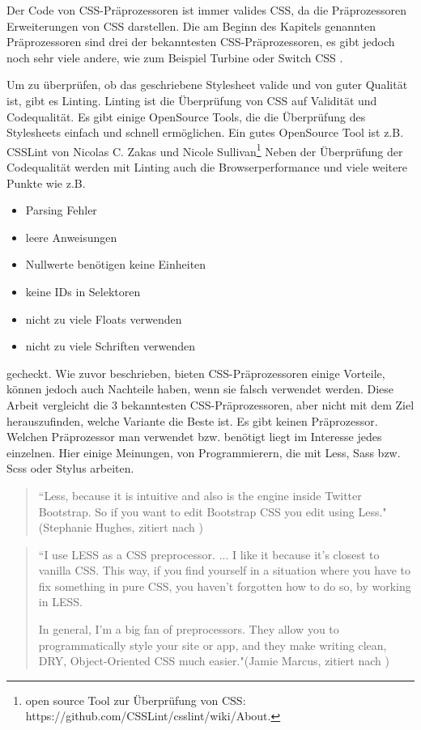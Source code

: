 Der Code von CSS-Präprozessoren ist immer valides CSS, da die Präprozessoren Erweiterungen von CSS darstellen. Die am Beginn des Kapitels genannten Präprozessoren sind drei der bekanntesten CSS-Präprozessoren, es gibt jedoch noch sehr viele andere, wie zum Beispiel Turbine oder Switch CSS \autocite[]{Jung.2010}.

Um zu überprüfen, ob das geschriebene Stylesheet valide und von guter Qualität ist, gibt es Linting. Linting ist die Überprüfung von CSS auf Validität und Codequalität. Es gibt einige OpenSource Tools, die die Überprüfung des Stylesheets einfach und schnell ermöglichen. Ein gutes OpenSource Tool ist z.B. CSSLint von Nicolas C. Zakas und Nicole Sullivan\footnote[1]{open source Tool zur Überprüfung von CSS: https://github.com/CSSLint/csslint/wiki/About.}\newline
Neben der Überprüfung der Codequalität werden mit Linting auch die Browserperformance und viele weitere Punkte wie z.B.
\begin{itemize}
  \item Parsing Fehler
  \item leere Anweisungen
  \item Nullwerte benötigen keine Einheiten
  \item keine IDs in Selektoren
  \item nicht zu viele Floats verwenden
  \item nicht zu viele Schriften verwenden
\end{itemize} 
gecheckt. \newline\newline
Wie zuvor beschrieben, bieten CSS-Präprozessoren einige Vorteile, können jedoch auch Nachteile haben,  wenn sie falsch verwendet werden. Diese Arbeit vergleicht die 3 bekanntesten CSS-Präprozessoren, aber nicht mit dem Ziel herauszufinden, welche Variante die Beste ist. Es gibt keinen \glqq{} Präprozessor.\newline
Welchen Präprozessor man verwendet bzw. benötigt liegt im Interesse jedes einzelnen. Hier einige Meinungen, von Programmierern, die mit Less, Sass bzw. Scss oder Stylus arbeiten. 
\begin{quote}
``Less, because it is intuitive and also is the engine inside Twitter Bootstrap. So if you want to edit Bootstrap CSS you edit using Less."(Stephanie Hughes, zitiert nach \cite[]{psdtowp.2014})
\end{quote} 
\begin{quote}
``I use LESS as a CSS preprocessor. ... I like it because it's closest to vanilla CSS. This way, if you find yourself in a situation where you have to fix something in pure CSS, you haven't forgotten how to do so, by working in LESS.

In general, I'm a big fan of preprocessors. They allow you to programmatically style your site or app, and they make writing clean, DRY, Object-Oriented CSS much easier."(Jamie Marcus, zitiert nach \cite[]{psdtowp.2014})
\end{quote} 
